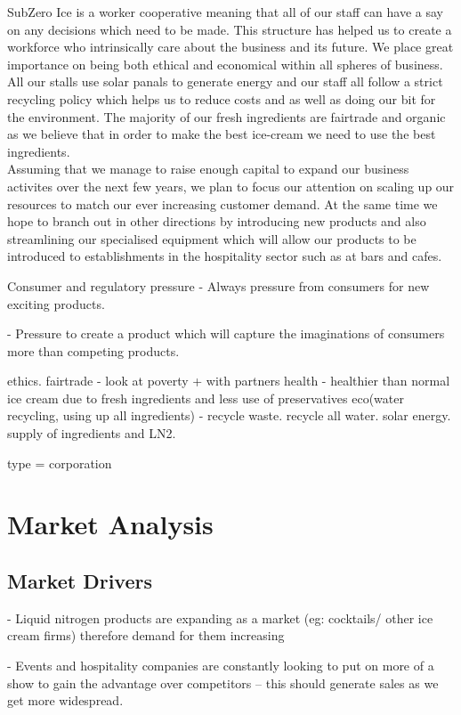 \documentclass{article}
\begin{document}
SubZero Ice is a worker cooperative meaning that all of our staff can have a say on any decisions which need to be made. This structure has helped us to create a workforce who intrinsically care about the business and its future. We place great importance on being both ethical and economical within all spheres of business. All our stalls use solar panals to generate energy and our staff all follow a strict recycling policy which helps us to reduce costs and as well as doing our bit for the environment. The majority of our fresh ingredients are fairtrade and organic as we believe that in order to make the best ice-cream we need to use the best ingredients. \\

Assuming that we manage to raise enough capital to expand our business activites over the next few years, we plan to focus our attention on scaling up our resources to match our ever increasing customer demand. At the same time we hope to branch out in other directions by introducing new products and also streamlining our specialised equipment which will allow our products to be introduced to establishments in the hospitality sector such as at bars and cafes.



Consumer and regulatory pressure
 - Always pressure from consumers for new exciting products.

 - Pressure to create a product which will capture the imaginations of
consumers more than competing products.

ethics.
fairtrade - look at poverty + with partners
health - healthier than normal ice cream due to fresh ingredients and less use of preservatives
eco(water recycling, using up all ingredients) - recycle waste. recycle all water. solar energy. supply of ingredients and LN2.

type = corporation


\section{Market Analysis}
  \subsection{Market Drivers}

 - Liquid nitrogen products are expanding as a market (eg: cocktails/
other ice cream firms) therefore demand for them increasing

 - Events and hospitality companies are constantly looking to put
on more of a show to gain the advantage over competitors – this
should generate sales as we get more widespread.
\end{document}
